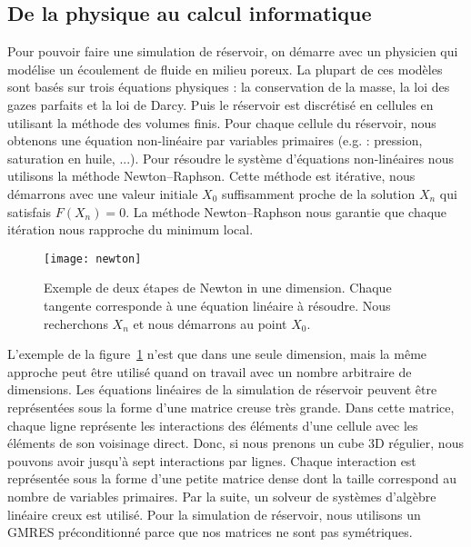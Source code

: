 \subsection{De la physique au calcul informatique}
Pour pouvoir faire une simulation de réservoir, on démarre avec un physicien qui modélise un écoulement de fluide en milieu poreux.
%
La plupart de ces modèles sont basés sur trois équations physiques : la conservation de la masse, la loi des gazes parfaits et la loi de Darcy.
%
Puis le réservoir est discrétisé en cellules en utilisant la méthode des volumes finis.
%
Pour chaque cellule du réservoir, nous obtenons une équation non-linéaire par variables primaires (e.g. : pression, saturation en huile, ...).
%
Pour résoudre le système d'équations non-linéaires nous utilisons la méthode Newton–Raphson.
%
Cette méthode est itérative, nous démarrons avec une valeur initiale $X_0$ suffisamment proche de la solution $X_n$ qui satisfais $F(X_n) = 0$.
%
La méthode Newton–Raphson nous garantie que chaque itération nous rapproche du minimum local.

\begin{figure}[!ht]
  \centering
  \texttt{[image: newton]}
  \caption{Exemple de deux étapes de Newton in une dimension.
    Chaque tangente corresponde à une équation linéaire à résoudre.
    Nous recherchons $X_n$ et nous démarrons au point $X_0$.}
\label{fig:newton}
\end{figure}

L'exemple de la figure~\ref{fig:newton} n'est que dans une seule dimension, mais la même approche peut être utilisé quand on travail avec un nombre arbitraire de dimensions.
%
Les équations linéaires de la simulation de réservoir peuvent être représentées sous la forme d'une matrice creuse très grande.
%
Dans cette matrice, chaque ligne représente les interactions des éléments d'une cellule avec les éléments de son voisinage direct.
%
Donc, si nous prenons un cube 3D régulier, nous pouvons avoir jusqu'à sept interactions par lignes.
%
Chaque interaction est représentée sous la forme d'une petite matrice dense dont la taille correspond au nombre de variables primaires.
%
Par la suite, un solveur de systèmes d'algèbre linéaire creux est utilisé.
%
Pour la simulation de réservoir, nous utilisons un GMRES préconditionné parce que nos matrices ne sont pas symétriques.
